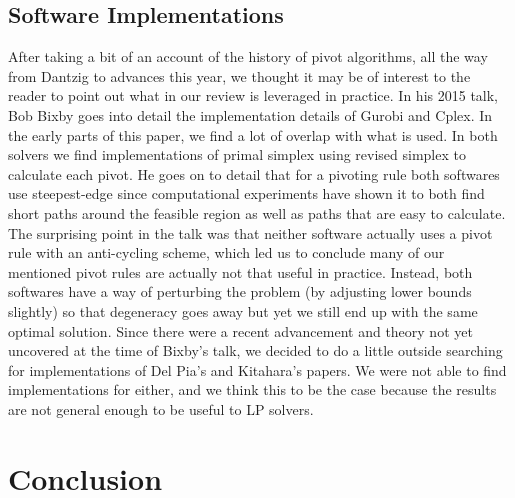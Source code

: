 \documentclass[11pt]{article}
\begin{document}
\subsection{Software Implementations}
After taking a bit of an account of the history of pivot algorithms, all the way from Dantzig to advances this year, we thought it may be of interest to the reader to point out what in our review is leveraged in practice. In his 2015 \cite{bixby} talk, Bob Bixby goes into detail the implementation details of Gurobi and Cplex. In the early parts of this paper, we find a lot of overlap with what is used. In both solvers we find implementations of primal simplex using revised simplex to calculate each pivot. He goes on to detail that for a pivoting rule both softwares use steepest-edge since computational experiments have shown it to both find short paths around the feasible region as well as paths that are easy to calculate. The surprising point in the talk was that neither software actually uses a pivot rule with an anti-cycling scheme, which led us to conclude many of our mentioned pivot rules are actually not that useful in practice. Instead, both softwares have a way of perturbing the problem (by adjusting lower bounds slightly) so that degeneracy goes away but yet we still end up with the same optimal solution. Since there were a recent advancement and theory not yet uncovered at the time of Bixby's talk, we decided to do a little outside searching for implementations of Del Pia's and Kitahara's papers. We were not able to find implementations for either, and we think this to be the case because the results are not general enough to be useful to LP solvers.

\section{Conclusion}


 
\end{document}
